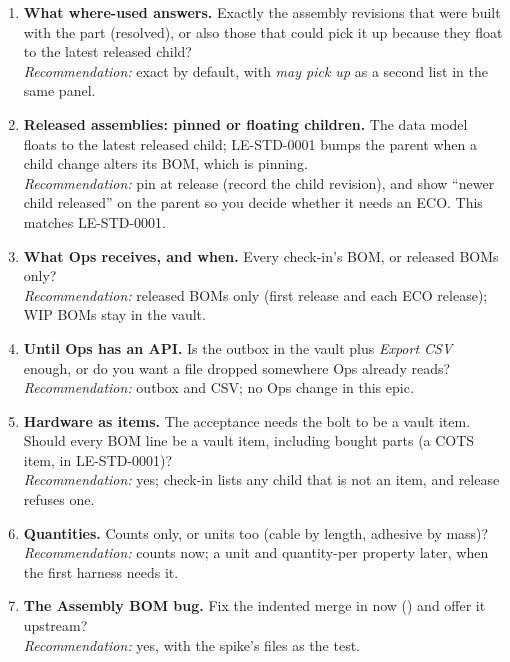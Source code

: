 \begin{enumerate}
  \item \textbf{What where-used answers.} Exactly the assembly revisions that were built with the part (resolved), or
        also those that could pick it up because they float to the latest released child?\\
        \emph{Recommendation:} exact by default, with \emph{may pick up} as a second list in the same panel.
  \item \textbf{Released assemblies: pinned or floating children.} The data model floats to the latest released child;
        LE-STD-0001 bumps the parent when a child change alters its BOM, which is pinning.\\
        \emph{Recommendation:} pin at release (record the child revision), and show ``newer child released'' on the
        parent so you decide whether it needs an ECO. This matches LE-STD-0001.
  \item \textbf{What Ops receives, and when.} Every check-in's BOM, or released BOMs only?\\
        \emph{Recommendation:} released BOMs only (first release and each ECO release); WIP BOMs stay in the vault.
  \item \textbf{Until Ops has an API.} Is the outbox in the vault plus \emph{Export CSV} enough, or do you want a file
        dropped somewhere Ops already reads?\\
        \emph{Recommendation:} outbox and CSV; no Ops change in this epic.
  \item \textbf{Hardware as items.} The acceptance needs the bolt to be a vault item. Should every BOM line be a vault
        item, including bought parts (a COTS item,  in LE-STD-0001)?\\
        \emph{Recommendation:} yes; check-in lists any child that is not an item, and release refuses one.
  \item \textbf{Quantities.} Counts only, or units too (cable by length, adhesive by mass)?\\
        \emph{Recommendation:} counts now; a unit and quantity-per property later, when the first harness needs it.
  \item \textbf{The Assembly BOM bug.} Fix the indented merge in  now (\code{[BW]}) and offer it
        upstream?\\
        \emph{Recommendation:} yes, with the spike's files as the test.
\end{enumerate}
